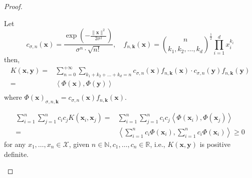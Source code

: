 \begin{proof}
\begin{enumerate}
              Let
              \begin{equation*}
                  c_{\sigma,n}\left(\mathbf{x}\right)=\frac{\exp\left(-\frac{\|\mathbf{x}\|^{2}}{2\sigma^{2}}\right)}{\sigma^{n}\cdot\sqrt{n!}},\quad f_{n,\mathbf{k}}\left(\mathbf{x}\right)=\binom{n}{k_{1},k_{2},\ldots,k_{d}}^{\frac{1}{2}}\prod_{i=1}^{d}x_{i}^{k_{i}}
              \end{equation*}
              then,
              \begin{equation*}
                  \begin{aligned}
                      K(\mathbf{x},\mathbf{y})= & \sum_{n=0}^{+\infty}\sum_{k_{1}+k_{2}+\ldots+k_{d}=n}c_{\sigma,n}\left(\mathbf{x}\right)f_{n,\mathbf{k}}\left(\mathbf{x}\right)\cdot c_{\sigma,n}\left(\mathbf{y}\right)f_{n,\mathbf{k}}\left(\mathbf{y}\right) \\
                      =                         & \left\langle\Phi\left(\mathbf{x}\right),\Phi\left(\mathbf{y}\right)\right\rangle                                                                                                                                \\
                  \end{aligned}
              \end{equation*}
              where $\Phi\left(\mathbf{x}\right)_{\sigma,n,\mathbf{k}}=c_{\sigma,n}\left(\mathbf{x}\right)f_{n,\mathbf{k}}\left(\mathbf{x}\right)$.

              \begin{equation*}
                  \begin{aligned}
                      \sum_{i=1}^{n}\sum_{j=1}^{n}c_{i}c_{j}K\left(\mathbf{x}_{i},\mathbf{x}_{j}\right)= & \sum_{i=1}^{n}\sum_{j=1}^{n}c_{i}c_{j}\left\langle\Phi\left(\mathbf{x}_{i}\right),\Phi\left(\mathbf{x}_{j}\right)\right\rangle       \\
                      =                                                                                  & \left\langle\sum_{i=1}^{n}c_{i}\Phi\left(\mathbf{x}_{i}\right),\sum_{i=1}^{n}c_{i}\Phi\left(\mathbf{x}_{i}\right)\right\rangle\geq 0
                  \end{aligned}
              \end{equation*}
              for any $x_{1},\ldots,x_{n}\in\mathcal{X}$, given $n\in\mathbb{N},c_{1},\ldots,c_{n}\in\mathbb{R}$, i.e., $K(\mathbf{x},\mathbf{y})$ is positive definite.
    \end{enumerate}
\end{proof}